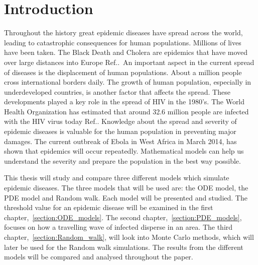 \documentclass[%
twoside,                 %
final,                   %
chapterprefix=true,      %
open=right               %
10pt]{book}
\begin{document}



% 
% 

\chapter{Introduction}
Throughout the history great epidemic diseases have spread across the world, leading to catastrophic consequences for human populations. Millions of lives have been taken. The Black Death and Cholera are epidemics that have moved over large distances into Europe Ref.\cite[p.~315]{murray2002mathematical}.~An important aspect in the current spread of diseases is the displacement of human populations. About a million people cross international borders daily. The growth of human population, especially in underdeveloped countries, is another factor that affects the spread. These developments played a key role in the spread of HIV in the 1980's. The World Health Organization has estimated that around 32.6 million people are infected with the HIV virus today Ref.\cite{who_hiv}. Knowledge about the spread and severity of epidemic diseases is valuable for the human population in preventing major damages. The current outbreak of Ebola in West Africa in March 2014, has shown that epidemics will occur repeatedly. Mathematical models can help us understand the severity and prepare the population in the best way possible.


\vspace{3mm}




\vspace{3mm}


This thesis will study and compare three different models which simulate epidemic diseases. The three models that will be used are: the ODE model, the PDE model and Random walk. Each model will be presented and studied. The threshold value for an epidemic disease will be examined in the first chapter,~\ref{section:ODE_models}. The second chapter,~\ref{section:PDE_models}, focuses on how a travelling wave of infected disperse in an area. The third chapter,~\ref{section:Random_walk}, will look into Monte Carlo methods, which will later be used for the Random walk simulations. The results from the different models will be compared and analysed throughout the paper.


\vspace{3mm}
\end{document}
